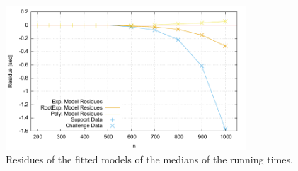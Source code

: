 \begin{figure}[tb]
\noindent \begin{centering}
\includegraphics[width=0.8\textwidth]{fittedResidues}
\par\end{centering}

\caption{\label{fig:Fitted-residues} Residues of the fitted models of the medians of the  running times. }
\end{figure}


